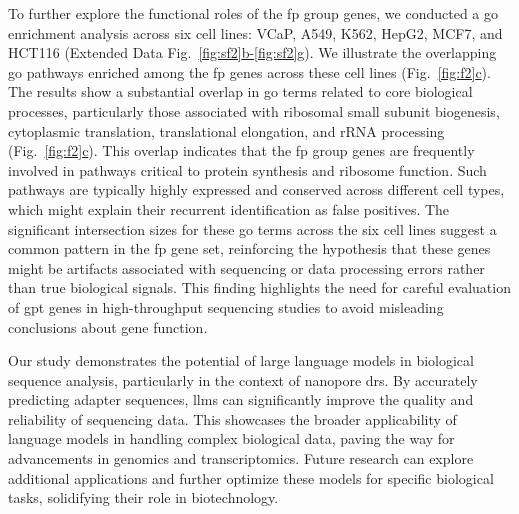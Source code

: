 \documentclass[pdflatex, sn-mathphys-num, lineno]{sn-jnl}%
\newcommand{\figref}[2]{Fig.~\hyperref[#1]{\ref*{#1}#2}}
\newcommand{\edfigrefrg}[3]{Extended Data Fig.~\hyperref[#1]{\ref*{#1}#2-\ref*{#1}#3}}
\theoremstyle{thmstyleone}%
\theoremstyle{thmstyletwo}%
\theoremstyle{thmstylethree}%
\begin{document}
To further explore the functional roles of the \gls{fp} group genes, we conducted a \gls{go} enrichment analysis across six cell lines: VCaP, A549, K562, HepG2, MCF7, and HCT116 (\edfigrefrg{fig:sf2}{b}{g}).
We illustrate the overlapping \gls{go} pathways enriched among the \gls{fp} genes across these cell lines (\figref{fig:f2}{c}).
The results show a substantial overlap in \gls{go} terms related to core biological processes, particularly those associated with ribosomal small subunit biogenesis, cytoplasmic translation, translational elongation, and rRNA processing (\figref{fig:f2}{c}).
This overlap indicates that the \gls{fp} group genes are frequently involved in pathways critical to protein synthesis and ribosome function.
Such pathways are typically highly expressed and conserved across different cell types, which might explain their recurrent identification as false positives.
The significant intersection sizes for these \gls{go} terms across the six cell lines suggest a common pattern in the \gls{fp} gene set, reinforcing the hypothesis that these genes might be artifacts associated with sequencing or data processing errors rather than true biological signals.
This finding highlights the need for careful evaluation of \gls{gpt} genes in high-throughput sequencing studies to avoid misleading conclusions about gene function.

Our study demonstrates the potential of large language models in biological sequence analysis, particularly in the context of nanopore \gls{drs}.
By accurately predicting adapter sequences,  \glspl{llm} can significantly improve the quality and reliability of sequencing data.
This showcases the broader applicability of language models in handling complex biological data, paving the way for advancements in genomics and transcriptomics.
Future research can explore additional applications and further optimize these models for specific biological tasks, solidifying their role in biotechnology.
\end{document}
